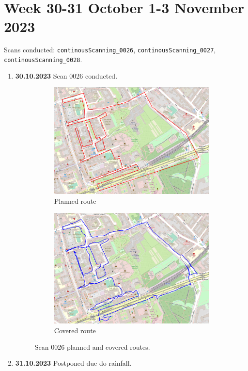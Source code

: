 \documentclass[a4paper,12pt]{book}
\begin{document}
\section{Week 30-31 October 1-3 November 2023}
Scans conducted: \verb|continousScanning_0026|, \verb|continousScanning_0027|, \verb|continousScanning_0028|.\\
\begin{enumerate}
	\item \textbf{30.10.2023} Scan 0026 conducted.
	\begin{figure}[H]
		\centering
		\begin{subfigure}{.95\textwidth}
			\centering
			\includegraphics[width=1\linewidth]{route_p26}
			\caption{Planned route}
			\label{fig:a26}
		\end{subfigure}%
		\linebreak
		\begin{subfigure}{.95\textwidth}
			\centering
			\includegraphics[width=1\linewidth]{route_c26}
			\caption{Covered route}
			\label{fig:b26}
		\end{subfigure}
		\caption{Scan 0026 planned and covered routes.}
		\label{fig:fig26}
	\end{figure}
	\item \textbf{31.10.2023} Postponed due do rainfall.
	

\end{enumerate}
\end{document}
